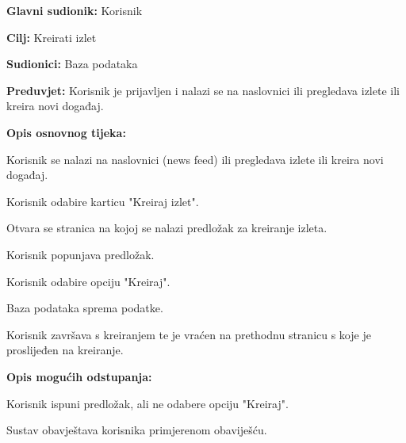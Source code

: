 		\noindent {}
		\begin{packed_item}
			
			\item \textbf{Glavni sudionik: } Korisnik
			\item  \textbf{Cilj:} Kreirati izlet
			\item  \textbf{Sudionici:} Baza podataka
			\item  \textbf{Preduvjet:} Korisnik je prijavljen i nalazi se na naslovnici ili pregledava izlete ili kreira novi događaj.
			\item  \textbf{Opis osnovnog tijeka:}
			
			\item[] \begin{packed_enum}
				
				\item Korisnik se nalazi na naslovnici (news feed) ili pregledava izlete ili kreira novi događaj.
				\item Korisnik odabire karticu "Kreiraj izlet".
				\item Otvara se stranica na kojoj se nalazi predložak za kreiranje izleta.
				\item Korisnik popunjava predložak.
				\item Korisnik odabire opciju "Kreiraj".
				\item Baza podataka sprema podatke.
				\item Korisnik završava s kreiranjem te je vraćen na prethodnu stranicu s koje je proslijeđen na kreiranje.
				
			\end{packed_enum}
			
			\item  \textbf{Opis mogućih odstupanja:}
			
			\item[] \begin{packed_item}
				
				\item[4.a] Korisnik ispuni predložak, ali ne odabere opciju "Kreiraj". 
				\item[] \begin{packed_enum}
					
					\item Sustav obavještava korisnika primjerenom obaviješću.
				\end{packed_enum}
				
				
			\end{packed_item}
		\end{packed_item}
		
